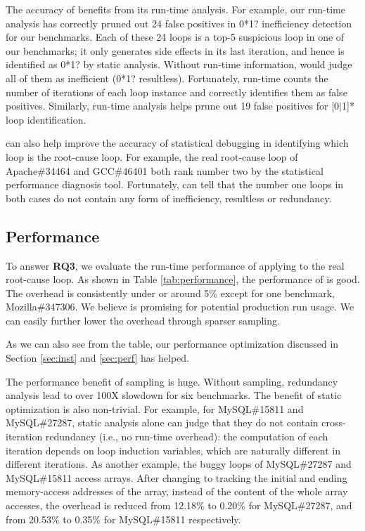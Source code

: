 The accuracy of \Tool benefits from its run-time analysis.
For example, our run-time analysis has correctly pruned out 24 false positives
in 0*1? inefficiency detection for our benchmarks. Each of these 24 loops is a
top-5 suspicious loop in one of our benchmarks; it only generates side effects
in its last iteration, and hence is identified as 0*1? by static analysis. 
Without run-time information, \Tool would judge
all of them as inefficient (0*1? resultless). Fortunately,
\Tool run-time counts the number of iterations of each loop instance and
correctly identifies them as false positives. Similarly, \Tool run-time analysis
helps prune out 19 false positives for [0$|$1]* loop identification.

\Tool can also help improve the accuracy of statistical debugging in
identifying which loop is the root-cause loop.
For example, the real root-cause loop of Apache\#34464 and GCC\#46401 both
rank number two by the statistical performance diagnosis tool.
Fortunately,
\Tool can tell that the number one loops in both cases do not contain
any form of inefficiency, resultless or redundancy. 

\subsection{Performance}
\label{sec:result_perf}



{\color{red}
To answer \textbf{RQ3}, we evaluate the run-time performance of
applying \Tool to the real root-cause loop. 
}
As shown in Table \ref{tab:performance}, 
the performance of \Tool is good. The overhead is consistently under or around 5\% 
except for one benchmark, Mozilla\#347306. 
We believe \Tool is promising for potential production
run usage.
We can easily further lower the overhead through sparser sampling.

As we can also see from the table, our performance optimization discussed in 
Section \ref{sec:inst} and \ref{sec:perf} has helped.

The performance benefit of sampling is huge.
Without sampling, redundancy
analysis lead to over 100X slowdown for six benchmarks.
The benefit of static optimization is also non-trivial. 
For example, for MySQL\#15811 and MySQL\#27287, static analysis alone can
judge that they do not contain cross-iteration redundancy (i.e., no run-time 
overhead): the computation of 
each iteration depends on loop induction variables, which are naturally different
in different iterations. 
As another example, the buggy loops of MySQL\#27287 and MySQL\#15811 access 
arrays. 
After changing to tracking the initial and ending memory-access addresses
of the array, instead of the content of the whole array accesses,
the overhead is reduced from 12.18\% to 0.20\% for MySQL\#27287, 
and from 20.53\% to 0.35\% for MySQL\#15811 respectively. 

